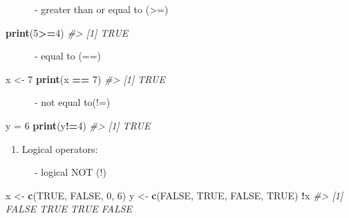 \documentclass[
]{book}
\newenvironment{Shaded}{\begin{snugshade}}{\end{snugshade}}
\newcommand{\CommentTok}[1]{\textcolor[rgb]{0.56,0.35,0.01}{\textit{#1}}}
\newcommand{\ConstantTok}[1]{\textcolor[rgb]{0.56,0.35,0.01}{#1}}
\newcommand{\DecValTok}[1]{\textcolor[rgb]{0.00,0.00,0.81}{#1}}
\newcommand{\FunctionTok}[1]{\textcolor[rgb]{0.13,0.29,0.53}{\textbf{#1}}}
\newcommand{\NormalTok}[1]{#1}
\newcommand{\OtherTok}[1]{\textcolor[rgb]{0.56,0.35,0.01}{#1}}
\newcommand{\SpecialCharTok}[1]{\textcolor[rgb]{0.81,0.36,0.00}{\textbf{#1}}}
\providecommand{\tightlist}{%
  \setlength{\itemsep}{0pt}\setlength{\parskip}{0pt}}
\begin{document}
~~~~~~- greater than or equal to (\textgreater=)

\begin{Shaded}
\begin{Highlighting}[]
\FunctionTok{print}\NormalTok{(}\DecValTok{5}\SpecialCharTok{\textgreater{}=}\DecValTok{4}\NormalTok{)}
\CommentTok{\#\textgreater{} [1] TRUE}
\end{Highlighting}
\end{Shaded}

~~~~~~- equal to (==)

\begin{Shaded}
\begin{Highlighting}[]
\NormalTok{x }\OtherTok{\textless{}{-}} \DecValTok{7}
\FunctionTok{print}\NormalTok{(x }\SpecialCharTok{==} \DecValTok{7}\NormalTok{)}
\CommentTok{\#\textgreater{} [1] TRUE}
\end{Highlighting}
\end{Shaded}

~~~~~~- not equal to(!=)

\begin{Shaded}
\begin{Highlighting}[]
\NormalTok{y }\OtherTok{=} \DecValTok{6}
\FunctionTok{print}\NormalTok{(y}\SpecialCharTok{!=}\DecValTok{4}\NormalTok{)}
\CommentTok{\#\textgreater{} [1] TRUE}
\end{Highlighting}
\end{Shaded}

\begin{enumerate}
\def\labelenumi{\arabic{enumi}.}
\setcounter{enumi}{2}
\tightlist
\item
  Logical operators:
\end{enumerate}

~~~~~~- logical NOT (!)

\begin{Shaded}
\begin{Highlighting}[]
\NormalTok{x }\OtherTok{\textless{}{-}} \FunctionTok{c}\NormalTok{(}\ConstantTok{TRUE}\NormalTok{, }\ConstantTok{FALSE}\NormalTok{, }\DecValTok{0}\NormalTok{, }\DecValTok{6}\NormalTok{)}
\NormalTok{y }\OtherTok{\textless{}{-}} \FunctionTok{c}\NormalTok{(}\ConstantTok{FALSE}\NormalTok{, }\ConstantTok{TRUE}\NormalTok{, }\ConstantTok{FALSE}\NormalTok{, }\ConstantTok{TRUE}\NormalTok{)}
\SpecialCharTok{!}\NormalTok{x}
\CommentTok{\#\textgreater{} [1] FALSE  TRUE  TRUE FALSE}
\end{Highlighting}
\end{Shaded}
\end{document}
